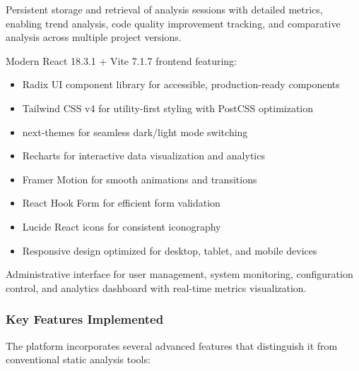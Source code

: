 \documentclass[12pt,a4paper]{article}
\begin{document}
\begin{description}[font=\bfseries, leftmargin=0.5in]
        \item[Analysis History Tracking]
        Persistent storage and retrieval of analysis sessions with detailed metrics, enabling trend analysis, code quality improvement tracking, and comparative analysis across multiple project versions.

        \item[Web-based Dashboard]
        Modern React 18.3.1 + Vite 7.1.7 frontend featuring:
        \begin{itemize}[leftmargin=0.3in, font=\normalfont]
            \item Radix UI component library for accessible, production-ready components
            \item Tailwind CSS v4 for utility-first styling with PostCSS optimization
            \item next-themes for seamless dark/light mode switching
            \item Recharts for interactive data visualization and analytics
            \item Framer Motion for smooth animations and transitions
            \item React Hook Form for efficient form validation
            \item Lucide React icons for consistent iconography
            \item Responsive design optimized for desktop, tablet, and mobile devices
        \end{itemize}

        \item[Admin Panel]
        Administrative interface for user management, system monitoring, configuration control, and analytics dashboard with real-time metrics visualization.
    \end{description}

    \subsubsection{Key Features Implemented}

    The platform incorporates several advanced features that distinguish it from conventional static analysis tools:
\end{document}
